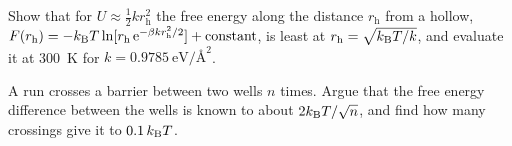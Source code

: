 \begin{exercise}
\label{ex:ob-fd}
Show that for $U \approx \frac12kr_{\mathrm h}^2$ the free energy along the distance
$r_{\mathrm h}$ from a hollow, $F(r_{\mathrm h}) = -k_{\mathrm{B}} T\ln[r_{\mathrm h}\,\mathrm{e}^{-\beta kr_{\mathrm h}^2/2}] +
\text{constant}$, is least at $r_{\mathrm h} = \sqrt{k_{\mathrm{B}} T/k}$, and evaluate it at
\SI{300}{\kelvin} for $k = \SI{0.9785}{\electronvolt\per\angstrom\squared}$.
\end{exercise}

\begin{exercise}[crossings]
\label{ex:ob-crossings}
A run crosses a barrier between two wells $n$ times. Argue that the free
energy difference between the wells is known to about $2k_{\mathrm{B}} T/\sqrt n$,
and find how many crossings give it to $0.1\,k_{\mathrm{B}} T$.
\end{exercise}
